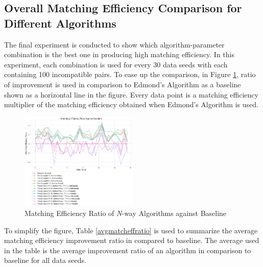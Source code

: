 \documentclass[conference]{IEEEtran}
\begin{document}
\subsection{Overall Matching Efficiency Comparison for Different Algorithms}
The final experiment is conducted to show which algorithm-parameter combination is the best one in producing high matching efficiency.
In this experiment, each combination is used for every 30 data seeds with each containing 100 incompatible pairs. To ease up the
comparison, in Figure \ref{matcheffratio}, ratio of improvement is used in comparison to Edmond's Algorithm as a baseline shown as a
horizontal line in the figure. Every data point is a matching efficiency multiplier of the matching efficiency obtained when Edmond's
Algorithm is used.

\begin{figure}[h]
    \includegraphics[width=0.5\textwidth]{images/matching_efficiency_ratio_against_baseline.png}
    \caption{Matching Efficiency Ratio of \textit{N}-way Algorithms against Baseline}
    \label{matcheffratio}
\end{figure}

To simplify the figure, Table \ref{avgmatcheffratio} is used to summarize the average matching efficiency improvement ratio in compared to baseline. The average used
in the table is the average improvement ratio of an algorithm in comparison to baseline for all data seeds.
\end{document}
